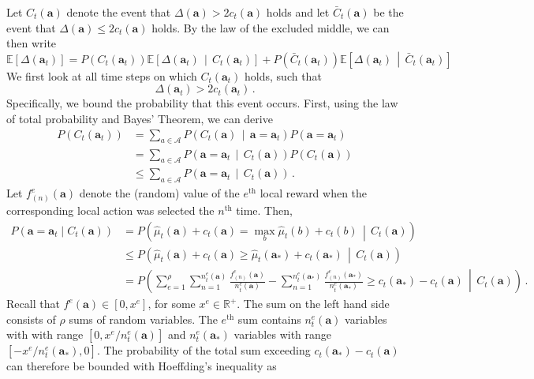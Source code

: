 \documentclass{article}
\newcommand{\est}{\hat{\mu}}
\newcommand{\prob}[1]{P\left( #1 \right)}
\newcommand{\md}{\,\middle|\,}
\begin{document}
Let $C_t(\mathbf{a})$ denote the event that $\Delta(\mathbf{a}) > 2 c_t(\mathbf{a})$ holds and let $\bar{C}_t(\mathbf{a})$ be the event that $\Delta(\mathbf{a}) \le 2 c_t(\mathbf{a})$ holds. By the law of the excluded middle, we can then write
\begin{equation}\label{decomp}
\mathbb{E}\left[ \Delta(\mathbf{a}_t) \right]
=
P( C_t(\mathbf{a}_t) ) \mathbb{E}\left[ \Delta(\mathbf{a}_t) \md C_t(\mathbf{a}_t) \right] 
+ P( \bar{C}_t(\mathbf{a}_t) ) \mathbb{E}\left[ \Delta(\mathbf{a}_t) \md \bar{C}_t(\mathbf{a}_t) \right]
\end{equation}
We first look at all time steps on which $C_t(\mathbf{a}_t)$ holds, such that
\begin{equation}\label{Dge2c}
\Delta(\mathbf{a}_t) > 2 c_t(\mathbf{a}_t)\,.
\end{equation}
Specifically, we bound the probability that this event occurs. First, using the law of total probability and Bayes' Theorem, we can derive
\begin{align}
\prob{ C_t(\mathbf{a}_t) }
& = \sum_{a \in \mathcal{A}} \prob{ C_t(\mathbf{a}) \md \mathbf{a} = \mathbf{a}_t } \prob{ \mathbf{a} = \mathbf{a}_t } \nonumber \\
& = \sum_{a \in \mathcal{A}} \prob{ \mathbf{a} = \mathbf{a}_t \md C_t(\mathbf{a}) } \prob{ C_t(\mathbf{a}) } \nonumber \\
& \le  \sum_{a \in \mathcal{A}} \prob{ \mathbf{a} = \mathbf{a}_t \md C_t(\mathbf{a}) } \label{sumPC} \,.
\end{align}
Let $f^e_{(n)}(\mathbf{a})$ denote the (random) value of the $e^\text{th}$ local reward when the corresponding local action was selected the $n^\text{th}$ time. Then,
\begin{align*}
\prob{ \mathbf{a} = \mathbf{a}_t \mid C_t(\mathbf{a}) }
& = \prob{ \est_t(\mathbf{a}) + c_t(\mathbf{a}) = \max_b \est_t(b) + c_t(b) \md C_t(\mathbf{a}) } \\
& \le \prob{ \est_t(\mathbf{a}) + c_t(\mathbf{a}) \ge \est_t(\mathbf{a}_*) + c_t(\mathbf{a}_*) \md C_t(\mathbf{a}) } \\
& = \prob{ \sum_{e=1}^\rho \sum_{n=1}^{n^e_t(\mathbf{a})} \frac{f^e_{(n)}(\mathbf{a})}{n^e_t(\mathbf{a})} - \sum_{n=1}^{n^e_t(\mathbf{a}_*)} \frac{f^e_{(n)}(\mathbf{a}_*)}{n^e_t(\mathbf{a}_*)} \ge c_t(\mathbf{a}_*) - c_t(\mathbf{a}) \md C_t(\mathbf{a}) } \,.
\end{align*}
Recall that $f^e(\mathbf{a}) \in [0,x^e]$, for some $x^e \in \mathbb{R}^+$. The sum on the left hand side consists of $\rho$ sums of random variables. The $e^\text{th}$ sum contains $n^e_t(\mathbf{a})$ variables with with range $[ 0, x^e/n^e_t(\mathbf{a})  ]$ and $n^e_t(\mathbf{a}_*)$ variables with range $[-x^e/n^e_t(\mathbf{a}_*),0]$. The probability of the total sum exceeding $c_t(\mathbf{a}_*) - c_t(\mathbf{a})$ can therefore be bounded with Hoeffding's inequality as
\end{document}
